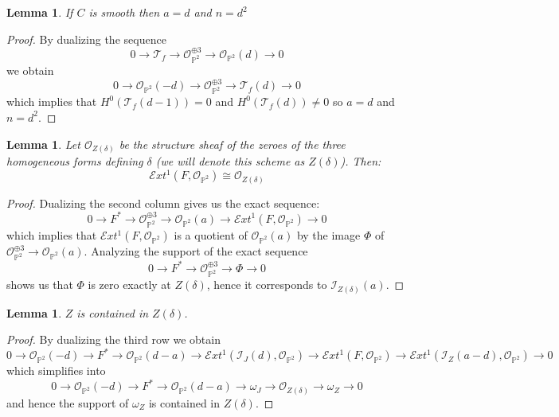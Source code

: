 \documentclass{article}
\newtheorem{lemma}[theorem]{Lemma}
\begin{document}
\begin{lemma}\label{smooth maximal bourbaki}
    If $C$ is smooth then $a = d$ and $n = d^2$
\end{lemma}
\begin{proof}
    By dualizing the sequence $$0 \to \mathcal{T}_f \to \mathcal{O}_{\mathbb{P}^2}^{\oplus 3} \to \mathcal{O}_{\mathbb{P}^2}(d) \to 0$$
    we obtain
    \begin{equation}
        0 \to \mathcal{O}_{\mathbb{P}^2}(-d) \to \mathcal{O}_{\mathbb{P}^2}^{\oplus 3} \to \mathcal{T}_f(d) \to 0
    \end{equation}
    which implies that $H^0(\mathcal{T}_f(d-1))=0$ and $H^0(\mathcal{T}_f(d))\not=0$ so $a = d$ and $n = d^2$.
\end{proof}
\begin{lemma}
Let $\mathcal{O}_{Z(\delta)}$ be the structure sheaf of the zeroes of the three homogeneous forms defining $\delta$ (we will denote this scheme as $Z(\delta)$). Then:
    \begin{equation}
        \mathcal{E}xt^1(F,\mathcal{O}_{\mathbb{P}^2}) \cong \mathcal{O}_{Z(\delta)}
    \end{equation}
\end{lemma}
\begin{proof}
    Dualizing the second column gives us the exact sequence:
    \begin{equation}
        0 \to F^* \to \mathcal{O}_{\mathbb{P}^2}^{\oplus 3} \to \mathcal{O}_{\mathbb{P}^2}(a) \to \mathcal{E}xt^1(F,\mathcal{O}_{\mathbb{P}^2}) \to 0
    \end{equation}
    which implies that $\mathcal{E}xt^1(F,\mathcal{O}_{\mathbb{P}^2})$ is a quotient of $\mathcal{O}_{\mathbb{P}^2}(a)$ by the image $\Phi$ of $\mathcal{O}_{\mathbb{P}^2}^{\oplus 3} \to \mathcal{O}_{\mathbb{P}^2}(a)$. Analyzing the support of the exact sequence $$0 \to F^* \to \mathcal{O}_{\mathbb{P}^2}^{\oplus 3} \to \Phi \to 0$$ shows us that $\Phi$ is zero exactly at $Z(\delta)$, hence it corresponds to $\mathcal{I}_{Z(\delta)}(a)$.
\end{proof}

\begin{lemma}
    $Z$ is contained in $Z(\delta)$.
\end{lemma}
\begin{proof}
By dualizing the third row we obtain
\begin{equation}
    0 \to \mathcal{O}_{\mathbb{P}^2}(-d) \to F^* \to \mathcal{O}_{\mathbb{P}^2}(d-a) \to \mathcal{E}xt^1(\mathcal{I}_J(d),\mathcal{O}_{\mathbb{P}^2}) \to \mathcal{E}xt^1(F,\mathcal{O}_{\mathbb{P}^2}) \to \mathcal{E}xt^1(\mathcal{I}_Z(a-d),\mathcal{O}_{\mathbb{P}^2}) \to 0
\end{equation}
which simplifies into
\begin{equation}
    0 \to \mathcal{O}_{\mathbb{P}^2}(-d) \to F^* \to \mathcal{O}_{\mathbb{P}^2}(d-a) \to \omega_J \to \mathcal{O}_{Z(\delta)} \to \omega_Z \to 0
\end{equation}
and hence the support of $\omega_Z$ is contained in $Z(\delta)$.
\end{proof}
\end{document}
